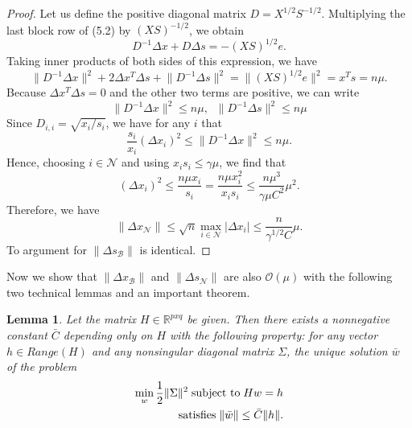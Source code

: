 \documentclass[a4paper,10 pt,titlepage,twoside]{book}
\theoremstyle{plain}
\newtheorem{lem}[thm]{Lemma}
\theoremstyle{definition}
\theoremstyle{remark}
\begin{document}
\begin{proof}
	Let us define the positive diagonal matrix $D = X^{1/2}S^{-1/2}$. Multiplying the last block row of (5.2) by $(XS)^{-1/2}$, we obtain 
	\begin{equation*}
	D^{-1}\Delta x + D \Delta s = -(XS)^{1/2}e.
	\end{equation*}
	Taking inner products of both sides of this expression, we have
		\begin{equation*}
	\lVert D^{-1}\Delta x \rVert^{2} + 2\Delta x^{T}\Delta s+ \lVert D^{-1}\Delta s \rVert^{2}= \lVert(XS)^{1/2}e\rVert^{2}= x^{T}s= n\mu.
	\end{equation*}
	Because $\Delta x^{T}\Delta s= 0$ and the other two terms are positive, we can write
	\begin{equation*}
	\lVert D^{-1}\Delta x\rVert^{2}\leq n\mu, \;\;\lVert D^{-1}\Delta s\rVert^{2}\leq n\mu
	\end{equation*}
	Since $D_{i,i}= \sqrt{x_{i}/s_{i}}$, we have for any $i$ that
	\begin{equation*}
	\frac{s_{i}}{x_{i}}(\Delta x_{i})^{2}\leq\lVert D^{-1}\Delta x\rVert^{2}\leq n\mu.
	\end{equation*}
	Hence, choosing $i\in\mathcal{N}$ and using $x_{i}s_{i}\leq\gamma\mu$, we find that
	\begin{equation*}
	(\Delta x_{i})^{2}\leq\frac{n\mu x_{i}}{s_{i}}=\frac{n\mu x_{i}^{2}}{x_{i}s_{i}}\leq\frac{n\mu^{3}}{\gamma\mu C^{2}}\mu^{2}.
	\end{equation*}
	Therefore, we have 
	\begin{equation*}
	\lVert \Delta x_{\mathcal{N}}\rVert \leq \sqrt{n}\max\limits_{i \in \mathcal{N}}|\Delta x_{i}|\leq\frac{n}{\gamma^{1/2}C}\mu.
	\end{equation*}
	To argument for $\lVert \Delta s_{\mathcal{B}}\rVert$ is identical.
\end{proof}
Now we show that $\lVert \Delta x_{\mathcal{B}}\rVert$ and $\lVert \Delta s_{\mathcal{N}}\rVert$ are also $\mathcal{O}(\mu)$ with the following two technical lemmas and an important theorem.
\begin{lem} \label{(T)}
	Let the matrix $H\in\mathbb{R}^{pxq}$ be given. Then there exists a nonnegative constant $\bar{C}$ depending only on $H$ with the following property: for any vector $h\in Range(H)$ and any nonsingular diagonal matrix $\Sigma$, the unique solution $\bar{w}$ of the problem
	\begin{align*}
	\min\limits_{w}\frac{1}{2}\lVert\Sigma\rVert^{2} \text{\;subject to\;} Hw = h\\\text{satisfies\;} \lVert\bar{w}\rVert\leq \bar{C}\lVert h\rVert.
	\end{align*}
\end{lem}
\end{document}
